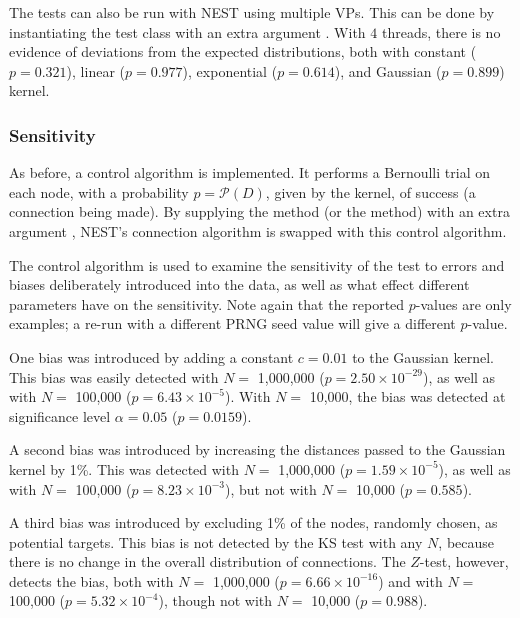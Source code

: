 The tests can also be run with NEST using multiple VPs. This can be done by instantiating the test class with an extra argument . With $4$ threads, there is no evidence of deviations from the expected distributions, both with constant ($p = 0.321$), linear ($p = 0.977$), exponential ($p = 0.614$), and Gaussian ($p = 0.899$) kernel.



\subsubsection{Sensitivity}

As before, a control algorithm is implemented. It performs a Bernoulli trial on each node, with a probability $p = \mathcal{P}(D)$, given by the kernel, of success (a connection being made). By supplying the  method (or the  method) with an extra argument , NEST's connection algorithm is swapped with this control algorithm. 


The control algorithm is used to examine the sensitivity of the test to errors and biases deliberately introduced into the data, as well as what effect different parameters have on the sensitivity. Note again that the reported $p$-values are only examples; a re-run with a different PRNG seed value will give a different $p$-value.

One bias was introduced by adding a constant $c = 0.01$ to the Gaussian kernel. This bias was easily detected with $N =$ 1,000,000 ($p = 2.50 \times 10^{-29}$), as well as with $N =$ 100,000 ($p = 6.43 \times 10^{-5}$). With $N =$ 10,000, the bias was detected at significance level $\alpha = 0.05$ ($p = 0.0159$). 

A second bias was introduced by increasing the distances passed to the Gaussian kernel by 1\%. This was detected with $N =$ 1,000,000 ($p = 1.59 \times 10^{-5}$), as well as with $N =$ 100,000 ($p = 8.23 \times 10^{-3}$), but not with $N =$ 10,000 ($p = 0.585$).

A third bias was introduced by excluding 1\% of the nodes, randomly chosen, as potential targets. This bias is not detected by the KS test with any $N$, because there is no change in the overall distribution of connections. The $Z$-test, however, detects the bias, both with $N =$ 1,000,000 ($p = 6.66\times 10^{-16}$) and with $N =$ 100,000 ($p = 5.32 \times 10^{-4}$), though not with $N =$ 10,000 ($p = 0.988$).

